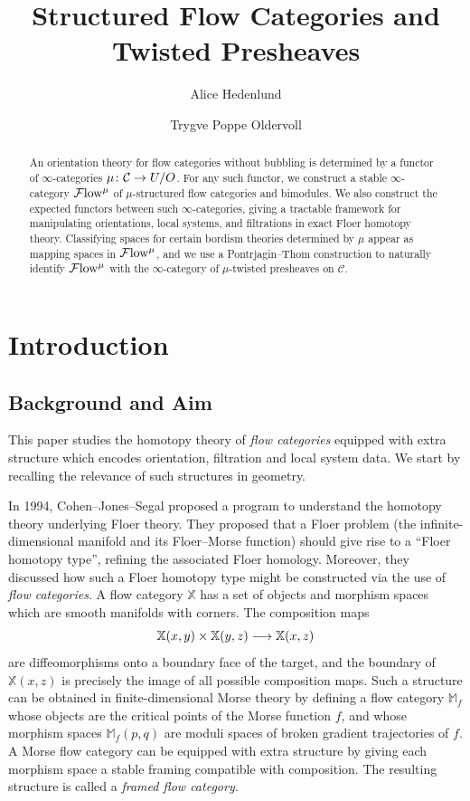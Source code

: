 \documentclass[10pt]{amsart}
\title{Structured Flow Categories and Twisted Presheaves}
\author{Alice Hedenlund}
\author{Trygve Poppe Oldervoll}
\numberwithin{equation}{section}
\theoremstyle{definition}
\newcommand{\Flow}{\cF\mathrm{low}\vphantom{w}}
\newcommand{\bM}{\mathbb{M}}
\newcommand{\bX}{\mathbb{X}}
\newcommand{\cC}{\mathcal{C}}
\newcommand{\cF}{\mathcal{F}}
\renewcommand{\to}{\mathchoice{\longrightarrow}{\rightarrow}{}{}}
\begin{document}
\begin{abstract}
	An orientation theory for flow categories without bubbling is determined by a functor of $\infty$-categories $\mu \colon \cC \to U/O$.
  For any such functor, we construct a stable $\infty$-category $\Flow^{\mu}$ of $\mu$-structured flow categories and bimodules.
  We also construct the expected functors between such $\infty$-categories, giving a tractable framework for manipulating orientations, local systems, and filtrations in exact Floer homotopy theory.
  Classifying spaces for certain bordism theories determined by $\mu$ appear as mapping spaces in $\Flow^{\mu}$, and we use a Pontrjagin--Thom construction to naturally identify $\Flow^{\mu}$ with the $\infty$-category of $\mu$-twisted presheaves on $\cC$.
\end{abstract}

\maketitle

\setcounter{tocdepth}{2}
\tableofcontents


\section*{Introduction}\label{sec:introduction}

\subsection*{Background and Aim}\label{subsec:background_and_aim}
This paper studies the homotopy theory of \emph{flow categories} equipped with extra structure which encodes orientation, filtration and local system data. We start by recalling the relevance of such structures in geometry.


In 1994, Cohen--Jones--Segal proposed a program to understand the homotopy theory underlying Floer theory.
They proposed that a Floer problem (the infinite-dimensional manifold and its Floer--Morse function) should give rise to a ``Floer homotopy type'', refining the associated Floer homology. Moreover, they discussed how such a Floer homotopy type might be constructed via the use of \emph{flow categories}.
A flow category $\mathbb{X}$ has a set of objects and morphism spaces which are smooth manifolds with corners.
The composition maps
\[
\mathbb{X}(x,y) \times \mathbb{X}(y,z) \to \mathbb{X}(x,z)
\]
are diffeomorphisms onto a boundary face of the target, and the boundary of $\bX(x,z)$ is precisely the image of all possible composition maps.
Such a structure can be obtained in finite-dimensional Morse theory by defining a flow category $\bM_{f}$ whose objects are the critical points of the Morse function $f$, and whose morphism spaces $\bM_{f}(p,q)$ are moduli spaces of broken gradient trajectories of $f$.
A Morse flow category can be equipped with extra structure by giving each morphism space a stable framing compatible with composition.
The resulting structure is called a \emph{framed flow category}.
\end{document}
